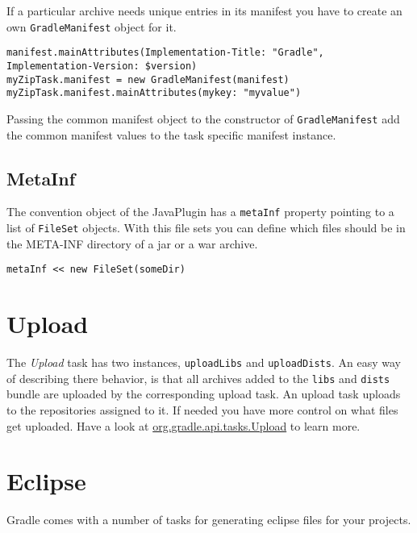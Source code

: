 If a particular archive needs unique entries in its manifest you have to create an own \texttt{GradleManifest} object for it.
\begin{Verbatim}
manifest.mainAttributes(Implementation-Title: "Gradle", Implementation-Version: $version)
myZipTask.manifest = new GradleManifest(manifest)
myZipTask.manifest.mainAttributes(mykey: "myvalue")
\end{Verbatim} 
Passing the common manifest object to the constructor of \texttt{GradleManifest} add the common manifest values to the task specific manifest instance.

\subsection{MetaInf} %
\label{sub:metainf}
The convention object of the JavaPlugin has a \texttt{metaInf} property pointing to a list of \texttt{FileSet} objects. With this file sets you can define which files should be in the META-INF directory of a jar or a war archive. 
\begin{Verbatim}
metaInf << new FileSet(someDir)
\end{Verbatim}

\section{Upload} %
\label{sec:upload}
The \emph{Upload} task has two instances, \texttt{uploadLibs} and \texttt{uploadDists}. An easy way of describing there behavior, is that all archives added to the \texttt{libs} and \texttt{dists} bundle are uploaded by the corresponding upload task. An upload task uploads to the repositories assigned to it. If needed you have more control on what files get uploaded. Have a look at \href{\API tasks/Upload.html}{org.gradle.api.tasks.Upload} to learn more.

\section{Eclipse} %
\label{sec:eclipse}
Gradle comes with a number of tasks for generating eclipse files for your projects. 
